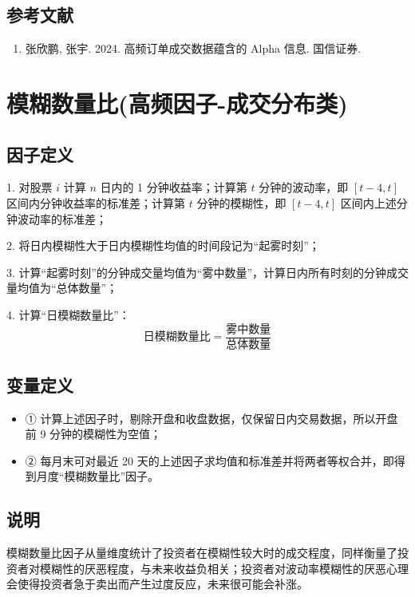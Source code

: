 \documentclass{article}
\begin{document}
\subsection{参考文献}
\begin{enumerate}
    \item 张欣鹏, 张宇. 2024. 高频订单成交数据蕴含的 Alpha 信息. 国信证券.
\end{enumerate}

\section{模糊数量比(高频因子-成交分布类)}

\subsection{因子定义}

1. 对股票 \( i \) 计算 \( n \) 日内的 1 分钟收益率；计算第 \( t \) 分钟的波动率，即 \([t-4, t]\) 区间内分钟收益率的标准差；计算第 \( t \) 分钟的模糊性，即 \([t-4, t]\) 区间内上述分钟波动率的标准差；

2. 将日内模糊性大于日内模糊性均值的时间段记为“起雾时刻”；

3. 计算“起雾时刻”的分钟成交量均值为“雾中数量”，计算日内所有时刻的分钟成交量均值为“总体数量”；

4. 计算“日模糊数量比”：
\begin{equation}
    \text{日模糊数量比} = \frac{\text{雾中数量}}{\text{总体数量}}
\end{equation}

\subsection{变量定义}
\begin{itemize}
    \item ① 计算上述因子时，剔除开盘和收盘数据，仅保留日内交易数据，所以开盘前 9 分钟的模糊性为空值；
    \item ② 每月末可对最近 20 天的上述因子求均值和标准差并将两者等权合并，即得到月度“模糊数量比”因子。
\end{itemize}

\subsection{说明}
模糊数量比因子从量维度统计了投资者在模糊性较大时的成交程度，同样衡量了投资者对模糊性的厌恶程度，与未来收益负相关；投资者对波动率模糊性的厌恶心理会使得投资者急于卖出而产生过度反应，未来很可能会补涨。
\end{document}
